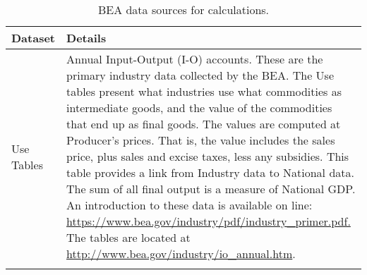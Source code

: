 \begin{table}
\caption[BEA data sources for calcuations]{BEA data sources for calculations.}
\begin{center}
  \begin{tabular}{l @{\hspace{2em}} p{10cm}}
   \toprule 
    Dataset & Details  \\ 

	\midrule
Use Tables & Annual Input-Output (I-O) accounts. These are the primary industry data collected by the BEA. The Use tables present what industries use what  commodities as intermediate goods, and the value of the commodities that end up as final goods. The values are computed at Producer’s prices. That is, the value includes the sales price, plus sales and excise taxes, less any subsidies. This table provides a link from Industry data to National data. The sum of all final output is a measure of National GDP.  An introduction to these data is available on line: \url{https://www.bea.gov/industry/pdf/industry_primer.pdf.} The tables are located at \url{ http://www.bea.gov/industry/io\_annual.htm}.\\
&\\


\end{tabular}
\end{center}
\end{table}
